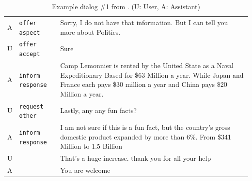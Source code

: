 \begin{table}[t]
\begin{center}
\begin{tabular}{p{0.2cm}p{3.8cm}p{11cm}}
            A & \texttt{offer aspect}                        & Sorry, I do not have that information. But I can tell you more about Politics.                                                                                                                                                                                                                            \\
            U & \texttt{offer accept}                        & Sure                                                                                                                                                                                                                                                                                                      \\
            A & \texttt{inform response}                     & Camp Lemonnier is rented by the United State as a Naval Expeditionary Based for \$63 Million a year. While Japan and France each pays \$30 million a year and China pays \$20 Million a year.                                                                                                             \\
            U & \texttt{request other}                       & Lastly, any any fun facts?                                                                                                                                                                                                                                                                                \\
            A & \texttt{inform response}                     & I am not sure if this is a fun fact, but the country's gross domestic product expanded by more than 6\%. From \$341 Million to 1.5 Billion                                                                                                                                                                \\
            U & \texttt{}                                    & That's a huge increase. thank you for all your help                                                                                                                                                                                                                                                       \\
            A & \texttt{}                                    & You are welcome                                                                                                                                                                                                                                                                                           \\
            \bottomrule[\heavyrulewidth]
        \end{tabular}
    \end{center}
    \caption{Example dialog \#1 from \rover{}. (U: User, A: Assistant)}
    \label{tab:dialog_example1}
\end{table}

